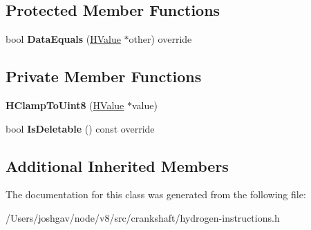 \subsection*{Protected Member Functions}
\begin{DoxyCompactItemize}
\item 
bool {\bfseries Data\+Equals} (\hyperlink{classv8_1_1internal_1_1_h_value}{H\+Value} $\ast$other) override\hypertarget{classv8_1_1internal_1_1_h_clamp_to_uint8_a754b2836d1ae6c9dfaa6a80d609dddda}{}\label{classv8_1_1internal_1_1_h_clamp_to_uint8_a754b2836d1ae6c9dfaa6a80d609dddda}

\end{DoxyCompactItemize}
\subsection*{Private Member Functions}
\begin{DoxyCompactItemize}
\item 
{\bfseries H\+Clamp\+To\+Uint8} (\hyperlink{classv8_1_1internal_1_1_h_value}{H\+Value} $\ast$value)\hypertarget{classv8_1_1internal_1_1_h_clamp_to_uint8_ae4dc84f065e3dae0c29300aa4eccfa0f}{}\label{classv8_1_1internal_1_1_h_clamp_to_uint8_ae4dc84f065e3dae0c29300aa4eccfa0f}

\item 
bool {\bfseries Is\+Deletable} () const  override\hypertarget{classv8_1_1internal_1_1_h_clamp_to_uint8_a2ac66ef280aefdd48f964e5272a9e33e}{}\label{classv8_1_1internal_1_1_h_clamp_to_uint8_a2ac66ef280aefdd48f964e5272a9e33e}

\end{DoxyCompactItemize}
\subsection*{Additional Inherited Members}


The documentation for this class was generated from the following file\+:\begin{DoxyCompactItemize}
\item 
/\+Users/joshgav/node/v8/src/crankshaft/hydrogen-\/instructions.\+h\end{DoxyCompactItemize}

